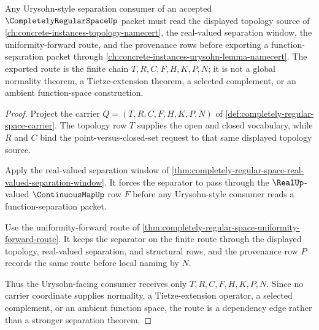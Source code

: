 \begin{theorem}
\label{thm:completely-regular-space-urysohn-consumer-route}
Any Urysohn-style separation consumer of an accepted $\CompletelyRegularSpaceUp$ packet must read the displayed topology source of \autoref{ch:concrete-instances-topology-namecert}, the real-valued separation window, the uniformity-forward route, and the provenance rows before exporting a function-separation packet through \autoref{ch:concrete-instances-urysohn-lemma-namecert}. The exported route is the finite chain $T,R,C,F,H,K,P,N$; it is not a global normality theorem, a Tietze-extension theorem, a selected complement, or an ambient function-space construction.
\end{theorem}
\begin{proof}
Project the carrier $Q=(T,R,C,F,H,K,P,N)$ of \autoref{def:completely-regular-space-carrier}. The topology row $T$ supplies the open and closed vocabulary, while $R$ and $C$ bind the point-versus-closed-set request to that same displayed topology source.

Apply the real-valued separation window of \autoref{thm:completely-regular-space-real-valued-separation-window}. It forces the separator to pass through the $\RealUp$-valued $\ContinuousMapUp$ row $F$ before any Urysohn-style consumer reads a function-separation packet.

Use the uniformity-forward route of \autoref{thm:completely-regular-space-uniformity-forward-route}. It keeps the separator on the finite route through the displayed topology, real-valued separation, and structural rows, and the provenance row $P$ records the same route before local naming by $N$.

Thus the Urysohn-facing consumer receives only $T,R,C,F,H,K,P,N$. Since no carrier coordinate supplies normality, a Tietze-extension operator, a selected complement, or an ambient function space, the route is a dependency edge rather than a stronger separation theorem.
\end{proof}



